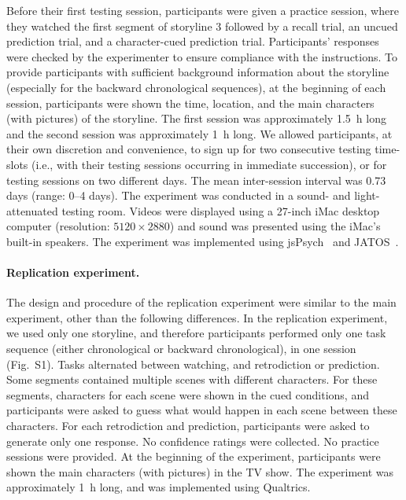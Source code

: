 \documentclass[10pt]{article}
\newcommand{\MethodsReplExp}{S1}
\begin{document}
Before their first testing session, participants were given a practice session, where they watched the first segment of storyline 3 followed by a recall trial, an uncued prediction trial, and a character-cued prediction trial. Participants' responses were checked by the experimenter to ensure compliance with the instructions. To provide participants with sufficient background information about the storyline (especially for the backward chronological sequences), at the beginning of each session, participants were shown the time, location, and the main characters (with pictures) of the storyline. The first session was approximately 1.5~h long and the second session was approximately 1~h long. We allowed participants, at their own discretion and convenience, to sign up for two consecutive testing time-slots (i.e., with their testing sessions occurring in immediate succession), or for testing sessions on two different days. The mean inter-session interval was 0.73 days (range: 0--4 days). The experiment was conducted in a sound- and light-attenuated testing room. Videos were displayed using a 27-inch iMac desktop computer (resolution: $5120 \times 2880$) and sound was presented using the iMac’s built-in speakers. The experiment was implemented using jsPsych~\citep{deLe15} and JATOS~\citep{LangEtal15}.

\paragraph{Replication experiment.} 
The design and procedure of the replication experiment were similar to the main experiment, other than the following differences. In the replication experiment, we used only one storyline, and therefore participants performed only one task sequence (either chronological or backward chronological), in one session (Fig.~\MethodsReplExp). Tasks alternated between watching, and retrodiction or prediction.  Some segments contained multiple scenes with different characters. For these segments, characters for each scene were shown in the cued conditions, and participants were asked to guess what would happen in each scene between these characters.  For each retrodiction and prediction, participants were asked to generate only one response. No confidence ratings were collected. No practice sessions were provided.  At the beginning of the experiment, participants were shown the main characters (with pictures) in the TV show. The experiment was approximately 1~h long, and was implemented using Qualtrics.
\end{document}
